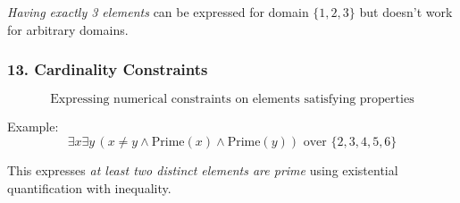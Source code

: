 \emph{Having exactly 3 elements} can be expressed for domain
\(\{1,2,3\}\) but doesn't work for arbitrary domains.

\subsubsection{13. Cardinality
Constraints}\label{cardinality-constraints}

\[\text{Expressing numerical constraints on elements satisfying properties}\]

Example:
\[\exists x \exists y \, (x \neq y \wedge \text{Prime}(x) \wedge \text{Prime}(y)) \text{ over } \{2,3,4,5,6\}\]

This expresses \emph{at least two distinct elements are prime} using
existential quantification with inequality.
